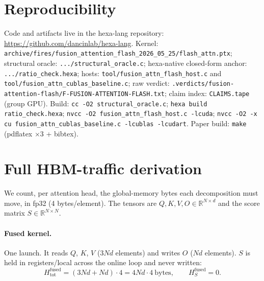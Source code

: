 \documentclass[11pt,a4paper]{article}
\begin{document}
\section*{Reproducibility}

Code and artifacts live in the hexa-lang repository:
\url{https://github.com/dancinlab/hexa-lang}. Kernel:
\texttt{archive/fires/fusion\_attention\_flash\_2026\_05\_25/flash\_attn.ptx};
structural oracle: \texttt{.../structural\_oracle.c}; hexa-native closed-form
anchor: \texttt{.../ratio\_check.hexa}; hosts:
\texttt{tool/fusion\_attn\_flash\_host.c} and
\texttt{tool/fusion\_attn\_cublas\_baseline.c}; raw verdict:
\texttt{.verdicts/fusion-attention-flash/F-FUSION-ATTENTION-FLASH.txt};
claim index: \texttt{CLAIMS.tape} (group GPU). Build:
\texttt{cc -O2 structural\_oracle.c}; \texttt{hexa build ratio\_check.hexa};
\texttt{nvcc -O2 fusion\_attn\_flash\_host.c -lcuda}; \texttt{nvcc -O2 -x cu
fusion\_attn\_cublas\_baseline.c -lcublas -lcudart}. Paper build:
\texttt{make} (pdflatex $\times 3$ + bibtex).

\appendix

\section{Full HBM-traffic derivation}
\label{app:hbm}

We count, per attention head, the global-memory bytes each decomposition must
move, in fp32 (4 bytes/element). The tensors are $Q,K,V,O\in\mathbb{R}^{N\times
d}$ and the score matrix $S\in\mathbb{R}^{N\times N}$.

\paragraph{Fused kernel.} One launch. It reads $Q$, $K$, $V$ ($3Nd$ elements)
and writes $O$ ($Nd$ elements). $S$ is held in registers/local across the online
loop and never written:
\begin{equation}
  H^{\mathrm{fused}}_{\mathrm{tot}} = (3Nd + Nd)\cdot 4 = 4Nd\cdot 4~\text{bytes},
  \qquad H^{\mathrm{fused}}_S = 0 .
\end{equation}
\end{document}
